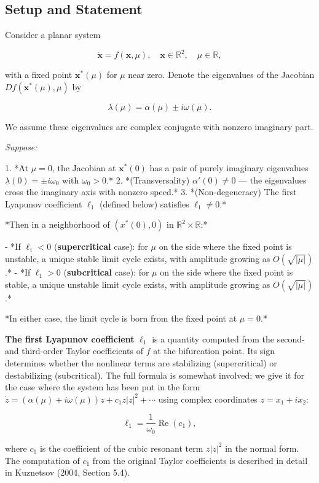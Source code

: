 \subsection{Setup and Statement}\label{sec:5.4.1}

Consider a planar system

\[
\dot{\mathbf{x}} = f(\mathbf{x}, \mu), \quad \mathbf{x} \in \mathbb{R}^2, \quad \mu \in \mathbb{R},
\]

with a fixed point $\mathbf{x}^*(\mu)$ for $\mu$ near zero. Denote the eigenvalues of the Jacobian $Df(\mathbf{x}^*(\mu), \mu)$ by

\[
\lambda(\mu) = \alpha(\mu) \pm i\omega(\mu).
\]

We assume these eigenvalues are complex conjugate with nonzero imaginary part.

\begin{theorem}\label{thm:5.6}
\textit{Suppose:}

1. *At $\mu = 0$, the Jacobian at $\mathbf{x}^*(0)$ has a pair of purely imaginary eigenvalues $\lambda(0) = \pm i\omega_0$ with $\omega_0 > 0$.*
2. *(Transversality) $\alpha'(0) \neq 0$ --- the eigenvalues cross the imaginary axis with nonzero speed.*
3. *(Non-degeneracy) The first Lyapunov coefficient $\ell_1$ (defined below) satisfies $\ell_1 \neq 0$.*

*Then in a neighborhood of $(x^*(0), 0)$ in $\mathbb{R}^2 \times \mathbb{R}$:*

- *If $\ell_1 < 0$ (\textbf{supercritical} case): for $\mu$ on the side where the fixed point is unstable, a unique stable limit cycle exists, with amplitude growing as $O(\sqrt{|\mu|})$.*
- *If $\ell_1 > 0$ (\textbf{subcritical} case): for $\mu$ on the side where the fixed point is stable, a unique unstable limit cycle exists, with amplitude growing as $O(\sqrt{|\mu|})$.*

*In either case, the limit cycle is born from the fixed point at $\mu = 0$.*

\textbf{The first Lyapunov coefficient} $\ell_1$ is a quantity computed from the second- and third-order Taylor coefficients of $f$ at the bifurcation point. Its sign determines whether the nonlinear terms are stabilizing (supercritical) or destabilizing (subcritical). The full formula is somewhat involved; we give it for the case where the system has been put in the form $\dot{z} = (\alpha(\mu) + i\omega(\mu))z + c_1 z|z|^2 + \cdots$ using complex coordinates $z = x_1 + ix_2$:

\[
\ell_1 = \frac{1}{\omega_0}\operatorname{Re}(c_1),
\]

where $c_1$ is the coefficient of the cubic resonant term $z|z|^2$ in the normal form. The computation of $c_1$ from the original Taylor coefficients is described in detail in Kuznetsov (2004, Section 5.4).
\end{theorem}


